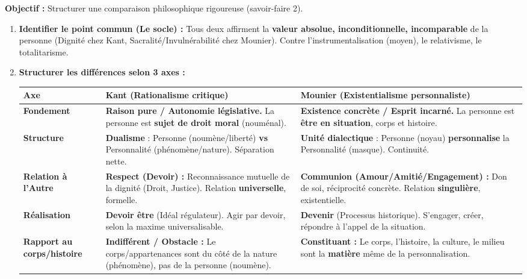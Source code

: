 \documentclass[11pt]{article}
\begin{document}
\begin{methode}
\textbf{Objectif :} Structurer une comparaison philosophique rigoureuse (savoir-faire 2).
\begin{enumerate}
    \item \textbf{Identifier le point commun (Le socle) :} Tous deux affirment la \textbf{valeur absolue, inconditionnelle, incomparable} de la personne (Dignité chez Kant, Sacralité/Invulnérabilité chez Mounier). Contre l'instrumentalisation (moyen), le relativisme, le totalitarisme.
    \item \textbf{Structurer les différences selon 3 axes :}
    \begin{center}
    \begin{tabularx}{\linewidth}{|l|X|X|}\hline
    \rowcolor{popblueL} \textbf{Axe} & \textbf{Kant (Rationalisme critique)} & \textbf{Mounier (Existentialisme personnaliste)} \\ \hline
    \textbf{Fondement} & \textbf{Raison pure / Autonomie législative.} La personne est \textbf{sujet de droit moral} (nouménal). & \textbf{Existence concrète / Esprit incarné.} La personne est \textbf{être en situation}, corps et histoire. \\ \hline
    \textbf{Structure} & \textbf{Dualisme} : Personne (noumène/liberté) \textbf{vs} Personnalité (phénomène/nature). Séparation nette. & \textbf{Unité dialectique} : Personne (noyau) \textbf{personnalise} la Personnalité (masque). Continuité. \\ \hline
    \textbf{Relation à l'Autre} & \textbf{Respect (Devoir) :} Reconnaissance mutuelle de la dignité (Droit, Justice). Relation \textbf{universelle}, formelle. & \textbf{Communion (Amour/Amitié/Engagement) :} Don de soi, réciprocité concrète. Relation \textbf{singulière}, existentielle. \\ \hline
    \textbf{Réalisation} & \textbf{Devoir être} (Idéal régulateur). Agir par devoir, selon la maxime universalisable. & \textbf{Devenir} (Processus historique). S'engager, créer, répondre à l'appel de la situation. \\ \hline
    \textbf{Rapport au corps/histoire} & \textbf{Indifférent / Obstacle :} Le corps/appartenances sont du côté de la nature (phénomène), pas de la personne (noumène). & \textbf{Constituant :} Le corps, l'histoire, la culture, le milieu sont la \textbf{matière} même de la personnalisation. \\ \hline
    \end{tabularx}

\end{center}
\end{enumerate}
\end{methode}
\end{document}
